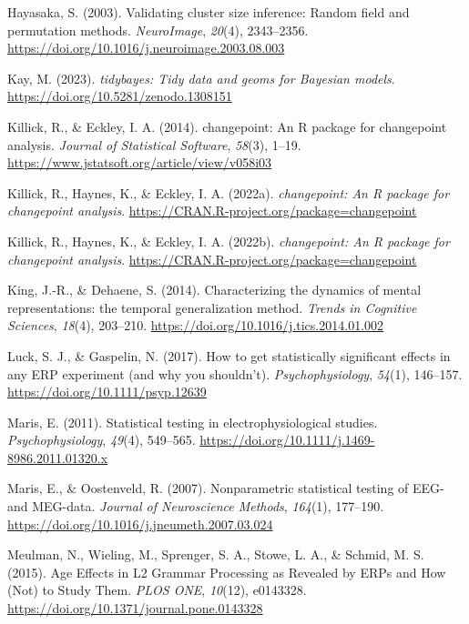 \documentclass[
  doc,
  floatsintext,
  longtable,
  a4paper,
  nolmodern,
  notxfonts,
  notimes,
  colorlinks=true,linkcolor=blue,citecolor=blue,urlcolor=blue]{apa7}
\newlength{\cslhangindent}
\newenvironment{CSLReferences}[2] %
 {\begin{list}{}{%
  \setlength{\itemindent}{0pt}
  \setlength{\leftmargin}{0pt}
  \setlength{\parsep}{0pt}
  \ifodd #1
   \setlength{\leftmargin}{\cslhangindent}
   \setlength{\itemindent}{-1\cslhangindent}
  \fi
  \setlength{\itemsep}{#2\baselineskip}}}
 {\end{list}}
\begin{document}
\begin{CSLReferences}{1}{0}
Hayasaka, S. (2003). Validating cluster size inference: Random field and
permutation methods. \emph{NeuroImage}, \emph{20}(4), 2343--2356.
\url{https://doi.org/10.1016/j.neuroimage.2003.08.003}

Kay, M. (2023). \emph{{tidybayes}: Tidy data and geoms for {Bayesian}
models}. \url{https://doi.org/10.5281/zenodo.1308151}

Killick, R., \& Eckley, I. A. (2014). {changepoint}: An {R} package for
changepoint analysis. \emph{Journal of Statistical Software},
\emph{58}(3), 1--19.
\url{https://www.jstatsoft.org/article/view/v058i03}

Killick, R., Haynes, K., \& Eckley, I. A. (2022a). \emph{{changepoint}:
An {R} package for changepoint analysis}.
\url{https://CRAN.R-project.org/package=changepoint}

Killick, R., Haynes, K., \& Eckley, I. A. (2022b). \emph{{changepoint}:
An {R} package for changepoint analysis}.
\url{https://CRAN.R-project.org/package=changepoint}

King, J.-R., \& Dehaene, S. (2014). Characterizing the dynamics of
mental representations: the temporal generalization method. \emph{Trends
in Cognitive Sciences}, \emph{18}(4), 203--210.
\url{https://doi.org/10.1016/j.tics.2014.01.002}

Luck, S. J., \& Gaspelin, N. (2017). How to get statistically
significant effects in any {ERP} experiment (and why you shouldn't).
\emph{Psychophysiology}, \emph{54}(1), 146--157.
\url{https://doi.org/10.1111/psyp.12639}

Maris, E. (2011). Statistical testing in electrophysiological studies.
\emph{Psychophysiology}, \emph{49}(4), 549--565.
\url{https://doi.org/10.1111/j.1469-8986.2011.01320.x}

Maris, E., \& Oostenveld, R. (2007). Nonparametric statistical testing
of EEG- and MEG-data. \emph{Journal of Neuroscience Methods},
\emph{164}(1), 177--190.
\url{https://doi.org/10.1016/j.jneumeth.2007.03.024}

Meulman, N., Wieling, M., Sprenger, S. A., Stowe, L. A., \& Schmid, M.
S. (2015). Age Effects in L2 Grammar Processing as Revealed by ERPs and
How (Not) to Study Them. \emph{PLOS ONE}, \emph{10}(12), e0143328.
\url{https://doi.org/10.1371/journal.pone.0143328}


\end{CSLReferences}
\end{document}
